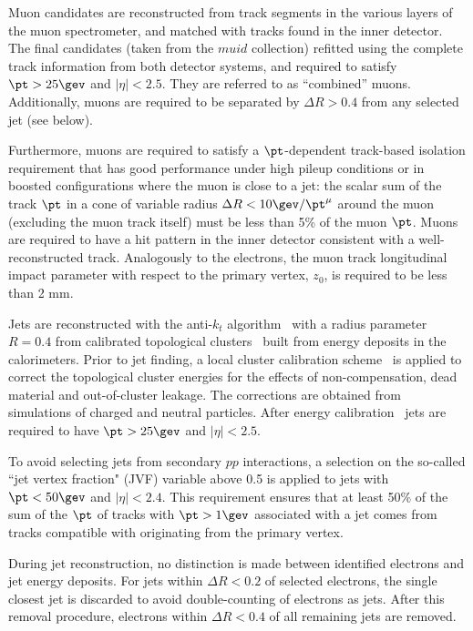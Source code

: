 Muon candidates are reconstructed from track segments in the various
layers of the muon spectrometer, and matched with tracks found in the
inner detector. The final candidates (taken from the $muid$ collection) refitted using the complete
track information from both detector systems, and required to satisfy
$\pt > 25\gev$ and $|\eta|<2.5$. They are referred to as ``combined'' muons.
Additionally, muons are required to
be separated by $\Delta R > 0.4 $ from any selected jet (see below).

Furthermore, muons are required to satisfy a $\pt$-dependent
track-based isolation
requirement that has good performance under high pileup
conditions or in boosted configurations where the muon is close
to a jet:  the scalar sum of the track $\pt$ in a cone of
variable radius $\Delta R < 10\gev/\pt^\mu$ around the muon
(excluding the muon track itself) must be less than 5\% of the muon $\pt$.
Muons  are required to have a hit pattern in the inner detector
consistent with a well-reconstructed track. Analogously to the electrons,
the muon
track longitudinal impact parameter with respect to the primary
vertex, $z_{0}$, is required to be less than 2 mm.

Jets are reconstructed with the anti-$k_t$
algorithm~\cite{ref:Cacciari2008,ref:Cacciari2006,ref:fastjet} with a
radius parameter $R=0.4$ from calibrated topological
clusters~\cite{ATLASTechnicalPaper} built from energy deposits in the
calorimeters.  Prior to jet finding, a local cluster calibration
scheme~\cite{LCW1,LCW2} is applied to correct the topological cluster
energies for the effects of non-compensation, dead material and
out-of-cluster leakage. The corrections are obtained from simulations
of charged and neutral particles.  After energy
calibration~\cite{ATLASJetEnergyMeasurement} jets are required to have
$\pt > 25\gev$ and $|\eta| < 2.5$.

To avoid selecting jets from secondary $pp$ interactions, a selection
on the so-called ``jet vertex fraction" (JVF) variable above 0.5
is applied to jets with $\pt <50\gev$ and $|\eta|<2.4$. This requirement ensures that at least 50\% of the sum of the $\pt$ of tracks
with $\pt>1\gev$ associated with a jet comes from tracks compatible
with originating from the primary vertex.

During jet reconstruction,
no distinction is made between identified electrons and jet energy
deposits.  For jets within $\Delta R < 0.2$ of selected electrons, the single closest jet is discarded to avoid double-counting of electrons as jets.  After this removal procedure, electrons within $\Delta R < 0.4$ of all remaining jets are removed.

